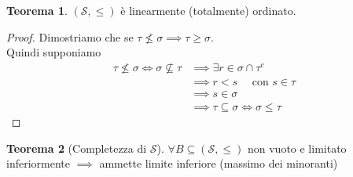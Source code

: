 \documentclass[a4paper,10pt]{article}
\theoremstyle{definition}
\theoremstyle{indentdefinition}
\theoremstyle{indentpostulate}
\theoremstyle{indenttheorem}
\newtheorem{thm}{Teorema}[section]
\theoremstyle{myremark}
\theoremstyle{indentgeneral}
\newenvironment{myboxed} 
{\noindent\begin{lrbox}{\mybox}\begin{minipage}{\textwidth}}
{\end{minipage}\end{lrbox}\fbox{\usebox{\mybox}}}
\begin{document}
\begin{myboxed}
\begin{thm}
    $(\mathscr{S},\le)$ è linearmente (totalmente) ordinato.
\end{thm}
\end{myboxed}
\begin{proof}
    Dimostriamo che se $\tau\nleq \sigma\implies \tau\ge\sigma$. \\
    Quindi supponiamo 
    \begin{align*}
        \tau\nleq\sigma\iff\sigma\nsubseteq\tau&\implies\exists r\in\sigma\cap\tau^c\\
        &\implies r<s\quad\text{ con } s\in\tau\\
        &\implies s\in\sigma\\
        &\implies \tau\subseteq\sigma\iff\sigma\le\tau
    \end{align*}
\end{proof}

\begin{myboxed}
    \begin{thm}[Completezza di $\mathscr{S}$]
        $\forall B\subseteq(\mathscr{S},\le)$ non vuoto e limitato inferiormente $\implies$ ammette limite inferiore (massimo dei minoranti)
    \end{thm}
\end{myboxed}
\end{document}
